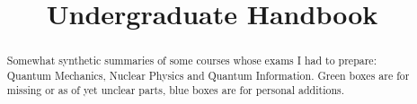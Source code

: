 \documentclass[a4paper, 12pt]{report}
\title{Undergraduate Handbook}
\begin{document}
\maketitle

\begin{abstract}
    Somewhat synthetic summaries of some courses whose exams I had to prepare: Quantum Mechanics, Nuclear Physics and Quantum Information.
    Green boxes are for missing or as of yet unclear parts, blue boxes are for  personal additions.
\end{abstract}



\setcounter{tocdepth}{4}
\tableofcontents
\let\tableofcontents\relax






\end{document}
